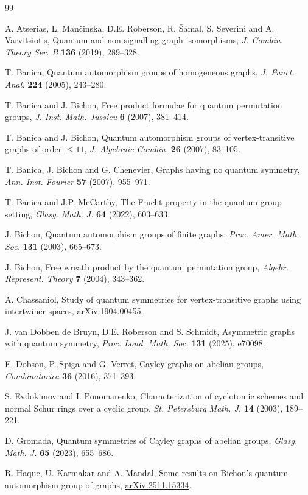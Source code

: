 \documentclass[11pt]{amsart}
\newcommand{\blackarxiv}[1]{{\hypersetup{urlcolor=black}\href{https://arxiv.org/pdf/#1}{arXiv:#1}}}
\begin{document}
\begin{thebibliography}{99}

A. Atserias, L. Man\v{c}inska, D.E. Roberson, R. \v{S}\'amal, S. Severini and A. Varvitsiotis, Quantum and non-signalling graph isomorphisms, {\em J. Combin. Theory Ser. B} {\bf 136} (2019), 289--328.

T. Banica, Quantum automorphism groups of homogeneous graphs, {\em J. Funct. Anal.} {\bf 224} (2005), 243--280.

T. Banica and J. Bichon, Free product formulae for quantum permutation groups, {\em J. Inst. Math. Jussieu} {\bf 6} (2007), 381--414.

T. Banica and J. Bichon, Quantum automorphism groups of vertex-transitive graphs of order $\leq11$, {\em J. Algebraic Combin.} {\bf 26} (2007), 83--105.

T. Banica, J. Bichon and G. Chenevier, Graphs having no quantum symmetry, {\em Ann. Inst. Fourier} {\bf 57} (2007), 955--971.

T. Banica and J.P. McCarthy, The Frucht property in the quantum group setting, {\em Glasg. Math. J.} {\bf 64} (2022), 603--633.

J. Bichon, Quantum automorphism groups of finite graphs, {\em Proc. Amer. Math. Soc.} {\bf 131} (2003), 665--673.

J. Bichon, Free wreath product by the quantum permutation group, {\em Algebr. Represent. Theory} {\bf 7} (2004), 343--362.

A. Chassaniol, Study of quantum symmetries for vertex-transitive graphs using intertwiner spaces, \blackarxiv{1904.00455}.

J. van Dobben de Bruyn, D.E. Roberson and S. Schmidt, Asymmetric graphs with quantum symmetry, {\em Proc. Lond. Math. Soc.} {\bf 131} (2025), e70098.

E. Dobson, P. Spiga and G. Verret, Cayley graphs on abelian groups, {\em Combinatorica} {\bf 36} (2016), 371--393.

S. Evdokimov and I. Ponomarenko, Characterization of cyclotomic schemes and normal Schur rings over a cyclic group, {\em St. Petersburg Math. J.} {\bf 14} (2003), 189--221.

D. Gromada, Quantum symmetries of Cayley graphs of abelian groups, {\em Glasg. Math. J.} {\bf 65} (2023), 655--686.

R. Haque, U. Karmakar and A. Mandal, Some results on Bichon's quantum automorphism group of graphs, \blackarxiv{2511.15334}.


\end{thebibliography}
\end{document}
